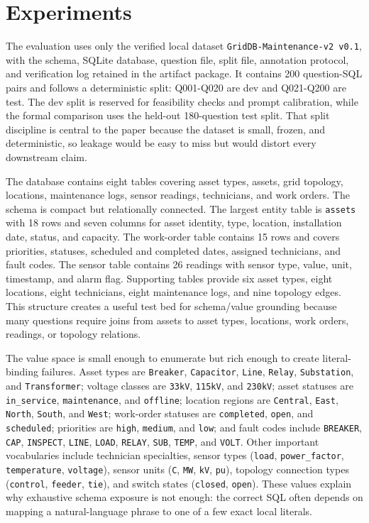 \documentclass{ieeeaccess}
\begin{document}
\section{Experiments}\label{experiments}

The evaluation uses only the verified local dataset \texttt{GridDB-Maintenance-v2\ v0.1}, with the schema, SQLite database, question file, split file, annotation protocol, and verification log retained in the artifact package. It contains 200 question-SQL pairs and follows a deterministic split: Q001-Q020 are dev and Q021-Q200 are test. The dev split is reserved for feasibility checks and prompt calibration, while the formal comparison uses the held-out 180-question test split. That split discipline is central to the paper because the dataset is small, frozen, and deterministic, so leakage would be easy to miss but would distort every downstream claim.

The database contains eight tables covering asset types, assets, grid topology, locations, maintenance logs, sensor readings, technicians, and work orders. The schema is compact but relationally connected. The largest entity table is \texttt{assets} with 18 rows and seven columns for asset identity, type, location, installation date, status, and capacity. The work-order table contains 15 rows and covers priorities, statuses, scheduled and completed dates, assigned technicians, and fault codes. The sensor table contains 26 readings with sensor type, value, unit, timestamp, and alarm flag. Supporting tables provide six asset types, eight locations, eight technicians, eight maintenance logs, and nine topology edges. This structure creates a useful test bed for schema/value grounding because many questions require joins from assets to asset types, locations, work orders, readings, or topology relations.

The value space is small enough to enumerate but rich enough to create literal-binding failures. Asset types are \texttt{Breaker}, \texttt{Capacitor}, \texttt{Line}, \texttt{Relay}, \texttt{Substation}, and \texttt{Transformer}; voltage classes are \texttt{33kV}, \texttt{115kV}, and \texttt{230kV}; asset statuses are \texttt{in\_service}, \texttt{maintenance}, and \texttt{offline}; location regions are \texttt{Central}, \texttt{East}, \texttt{North}, \texttt{South}, and \texttt{West}; work-order statuses are \texttt{completed}, \texttt{open}, and \texttt{scheduled}; priorities are \texttt{high}, \texttt{medium}, and \texttt{low}; and fault codes include \texttt{BREAKER}, \texttt{CAP}, \texttt{INSPECT}, \texttt{LINE}, \texttt{LOAD}, \texttt{RELAY}, \texttt{SUB}, \texttt{TEMP}, and \texttt{VOLT}. Other important vocabularies include technician specialties, sensor types (\texttt{load}, \texttt{power\_factor}, \texttt{temperature}, \texttt{voltage}), sensor units (\texttt{C}, \texttt{MW}, \texttt{kV}, \texttt{pu}), topology connection types (\texttt{control}, \texttt{feeder}, \texttt{tie}), and switch states (\texttt{closed}, \texttt{open}). These values explain why exhaustive schema exposure is not enough: the correct SQL often depends on mapping a natural-language phrase to one of a few exact local literals.
\end{document}
